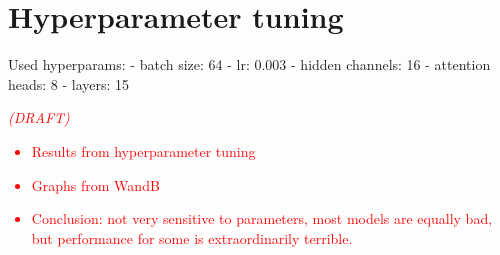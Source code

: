 \documentclass[english, 12pt, a4paper, sci, utf8, a-2b, online]{aaltothesis}
\newcommand{\draft}[1]{\textcolor{red}{\em (DRAFT) #1}}
\begin{document}
\clearpage
\thesisappendix

\section{Hyperparameter tuning}
\label{app:hyperparams}
Used hyperparams:
- batch size: 64
- lr: 0.003
- hidden channels: 16
- attention heads: 8
- layers: 15


\draft{
    \begin{itemize}
        \item Results from hyperparameter tuning
        \item Graphs from WandB
        \item Conclusion: not very sensitive to parameters, most models are equally bad, but performance for some is extraordinarily terrible.
    \end{itemize}
}
\end{document}
